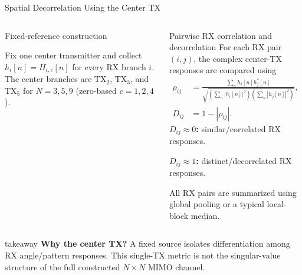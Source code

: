 \begin{frame}{Spatial Decorrelation Using the Center TX}
\scriptsize
\begin{columns}[T,onlytextwidth]
  \begin{block}{Fixed-reference construction}
    \centering

    \vspace{0.10cm}
    Fix one center transmitter and collect
    $h_i[n]=H_{i,c}[n]$ for every RX branch $i$.
    The center branches are $\mathrm{TX}_2$, $\mathrm{TX}_3$, and
    $\mathrm{TX}_5$ for $N=3,5,9$ (zero-based $c=1,2,4$).
  \end{block}

  \begin{block}{Pairwise RX correlation and decorrelation}
    For each RX pair $(i,j)$, the complex center-TX responses are compared using
    \begin{align*}
      \rho_{ij}&=
      \frac{\sum_n h_i[n]h_j^*[n]}
      {\sqrt{\left(\sum_n|h_i[n]|^2\right)
                   \left(\sum_n|h_j[n]|^2\right)}} ,\\[-0.15em]
      D_{ij}&=1-|\rho_{ij}|.
    \end{align*}
    \textbf{$D_{ij}\approx0$:} similar/correlated RX responses.\par\smallskip
    \textbf{$D_{ij}\approx1$:} distinct/decorrelated RX responses.\par\smallskip
    All RX pairs are summarized using global pooling or a typical local-block
    median.
  \end{block}
\end{columns}

\vspace{0.10cm}
\begin{beamercolorbox}[rounded=true,sep=0.8ex,wd=\linewidth]{takeaway}
  \textbf{Why the center TX?} A fixed source isolates differentiation among RX
  angle/pattern responses. This single-TX metric is not the singular-value
  structure of the full constructed $N\!\times\!N$ MIMO channel.
\end{beamercolorbox}
\end{frame}


